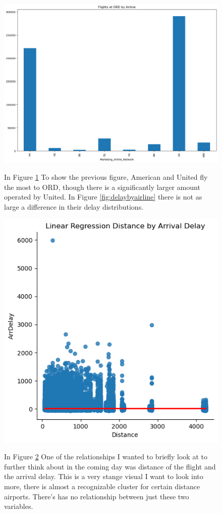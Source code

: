 \documentclass[a4paper,12pt]{article}
\begin{document}
\begin{figure}
    \centering
    \includegraphics*[scale=.40]{../../img/flights_by_airline.png}
    \caption[]{}
    \label{fig:flightsbyairline} 
    In Figure \ref{fig:flightsbyairline} To show the previous figure, American and United fly the most to ORD, though there is a significantly larger amount operated by United. In Figure \ref{fig:delaybyairline} 
    there is not as large a difference in their delay distributions.
\end{figure}

\begin{figure}
    \centering
    \includegraphics*[]{../../img/dist_by_delay.png}
    \caption[]{}
    \label{fig:lm_disbydelay}
    In Figure \ref{fig:lm_disbydelay} One of the relationships I wanted to briefly look at to further think about in the coming day was distance of the flight and the arrival delay.
    This is a very stange visual I want to look into more, there is almost a recognizable cluster for certain distance airports. There's has no relationship between just these two variables.
\end{figure}
\end{document}
